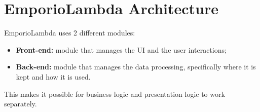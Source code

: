 \section{EmporioLambda Architecture}
EmporioLambda uses 2 different modules:
\begin{itemize}
\item \textbf{Front-end:} module that manages the UI and the user interactions;
\item \textbf{Back-end:} module that manages the data processing, specifically where it is kept and how it is used.
\end{itemize}
This makes it possible for business logic and presentation logic to work separately.


\newpage

\newpage

\newpage

\newpage

\newpage